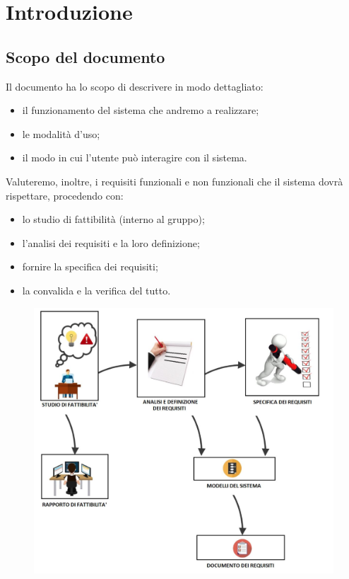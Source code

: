 \documentclass{article}
\begin{document}
    
    \tableofcontents
    
    \pagebreak
      
    \section{Introduzione}
    
    \subsection{Scopo del documento}
    
    Il documento ha lo scopo di descrivere in modo dettagliato:
    \begin{itemize}
    \item il funzionamento del sistema che andremo a realizzare;
    \item le modalità d’uso;
    \item il modo in cui l’utente può interagire con il sistema.
    \end{itemize}
    
    Valuteremo, inoltre, i requisiti funzionali e non funzionali che il sistema dovrà rispettare, procedendo con:
    \begin{itemize}
    \item lo studio di fattibilità (interno al gruppo);
    \item l’analisi dei requisiti e la loro definizione;
    \item fornire la specifica dei requisiti;
    \item la convalida e la verifica del tutto.
    \end{itemize}
    
    \vspace{10pt}
    \begin{figure}[htbp]
    \centering
    \includegraphics[width=12cm]{cazzate.png}
    \end{figure}
    
\end{document}
